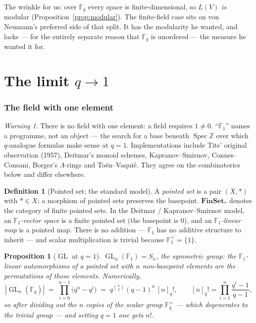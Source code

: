 \documentclass[11pt,a4paper]{article}
\newtheorem{proposition}[theorem]{Proposition}
\theoremstyle{definition}
\newtheorem{definition}[theorem]{Definition}
\theoremstyle{remark}
\newtheorem{warning}[theorem]{Warning}
\newcommand{\FF}{\mathbb{F}}
\newcommand{\ZZ}{\mathbb{Z}}
\newcommand{\cat}[1]{\mathbf{#1}}
\newcommand{\FinSet}{\cat{FinSet}}
\DeclareMathOperator{\Spec}{Spec}
\DeclareMathOperator{\GL}{GL}
\begin{document}
The wrinkle for us: over $\FF_q$ every space is finite-dimensional, so $L(V)$ \emph{is}
modular (Proposition~\ref{prop:modular}). The finite-field case sits on von Neumann's
preferred side of that split. It has the modularity he wanted, and lacks --- for the entirely
separate reason that $\FF_q$ is unordered --- the measure he wanted it for.


\newpage
\part{The limit $q \to 1$}

\section{The field with one element}

\begin{warning}
There is no field with one element: a field requires $1 \neq 0$. ``$\FF_1$'' names a
programme, not an object --- the search for a base beneath $\Spec \ZZ$ over which
$q$-analogue formulas make sense at $q = 1$. Implementations include Tits' original
observation (1957), Deitmar's monoid schemes, Kapranov--Smirnov, Connes--Consani, Borger's
$\Lambda$-rings and To\"en--Vaqui\'e. They agree on the combinatorics below and differ
elsewhere.
\end{warning}

\begin{definition}[Pointed set; the standard model]
A \emph{pointed set} is a pair $(X, \ast)$ with $\ast \in X$; a morphism of pointed sets
preserves the basepoint. $\FinSet_{\ast}$ denotes the category of finite pointed sets. In the
Deitmar / Kapranov--Smirnov model, an \emph{$\FF_1$-vector space} is a finite pointed set (the
basepoint is $0$), and an \emph{$\FF_1$-linear map} is a pointed map. There is no addition ---
$\FF_1$ has no additive structure to inherit --- and scalar multiplication is trivial because
$\FF_1^{\times} = \{1\}$.
\end{definition}

\begin{proposition}[$\GL$ at $q = 1$]
$\GL_n(\FF_1) = S_n$, the symmetric group: the $\FF_1$-linear automorphisms of a pointed set
with $n$ non-basepoint elements are the permutations of those elements. Numerically,
\[
  |\GL_n(\FF_q)| \;=\; \prod_{i=0}^{n-1}\bigl(q^{n} - q^{i}\bigr)
  \;=\; q^{\binom{n}{2}} (q-1)^{n} \,[n]_q!,
  \qquad [n]_q! = \prod_{i=1}^{n} \frac{q^{i}-1}{q-1},
\]
so after dividing out the $n$ copies of the scalar group $\FF_q^{\times}$ --- which
degenerates to the trivial group --- and setting $q = 1$ one gets $n!$.
\end{proposition}
\end{document}
